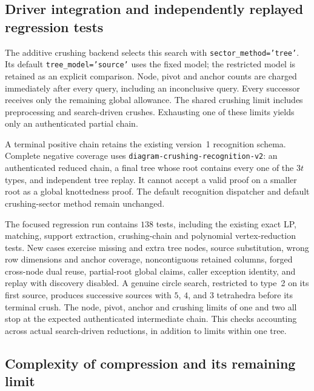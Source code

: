 \subsection{Driver integration and independently replayed regression tests}

The additive crushing backend selects this search with
\texttt{sector\_method='tree'}.  Its default
\texttt{tree\_model='source'} uses the fixed model; the restricted model is
retained as an explicit comparison.  Node, pivot and anchor counts are
charged immediately after every query, including an inconclusive query.
Every successor receives only the remaining global allowance.  The shared
crushing limit includes preprocessing and search-driven crushes.  Exhausting
one of these limits yields only an authenticated partial chain.

A terminal positive chain retains the existing version~1 recognition
schema.  Complete negative coverage uses
\texttt{diagram-crushing-recognition-v2}: an authenticated reduced chain,
a final tree whose root contains every one of the $3t$ types, and independent
tree replay.  It cannot accept a valid proof on a smaller root as a global
knottedness proof.  The default recognition dispatcher and default
crushing-sector method remain unchanged.

The focused regression run contains $138$ tests, including the existing
exact LP, matching, support extraction, crushing-chain and polynomial
vertex-reduction tests.  New cases exercise missing and extra tree nodes,
source substitution, wrong row dimensions and anchor coverage, noncontiguous
retained columns, forged cross-node dual reuse, partial-root global claims,
caller exception identity, and replay with discovery disabled.  A genuine
circle search, restricted to type~2 on its first source, produces successive
sources with $5$, $4$, and $3$ tetrahedra before its terminal crush.  The
node, pivot, anchor and crushing limits of one and two all stop at the
expected authenticated intermediate chain.  This checks accounting across
actual search-driven reductions, in addition to limits within one tree.

\subsection{Complexity of compression and its remaining limit}

